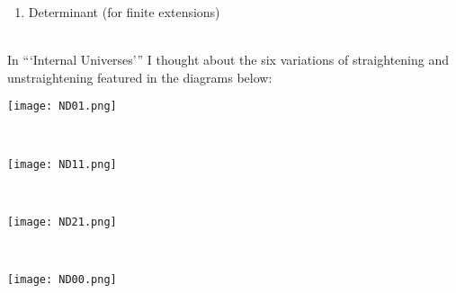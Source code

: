 \documentclass{book}
\theoremstyle{definition}
\begin{document}
\begin{enumerate}
\item Determinant (for finite extensions)
\end{enumerate}





\iffalse
contractibility of the E's:

- For a locally contractible group?

https://en.wikipedia.org/wiki/Connection_(vector_bundle)
\fi

\iffalse
Next the B can be thought of as pushing all of the information into ∞-Cat
b can be throught of as pushing information into...

MAKE SURE TO INCLUDE //
\fi

\iffalse
\begin{center}
\texttt{[image: mastertable.png]}  \\
\end{center}
\fi

\thispagestyle{empty}

\newpage

\ \\

In ```Internal Universes''' I thought about the six variations of straightening and unstraightening featured in the diagrams below:\\


\begin{center}
\texttt{[image: ND01.png]} \\
\end{center}

\ \\

\begin{center}
\texttt{[image: ND11.png]} \\
\end{center}

\ \\

\begin{center}
\texttt{[image: ND21.png]} \\
\end{center}


\newpage

\ \\

\begin{center}
\texttt{[image: ND00.png]} \\
\end{center}
\end{document}
